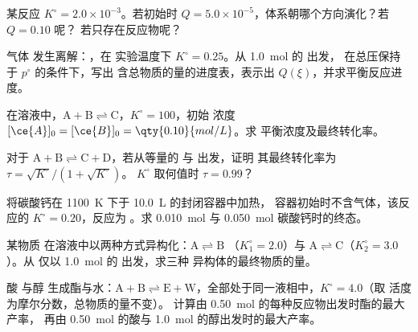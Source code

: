 \begin{exercise}[$\star\star$]\label{exo:b1:extent-q-and-k:6}
某反应 $K^\circ = 2.0 \times 10^{-3}$。若初始时
$Q = 5.0 \times 10^{-5}$，体系朝哪个方向演化？若 $Q = 0.10$ 呢？
若只存在反应物呢？
\end{exercise}

\begin{exercise}[$\star\star$]\label{exo:b1:extent-q-and-k:7}
气体  发生离解：，在
实验温度下 $K^\circ = 0.25$。从 \qty{1.0}{mol} 的  出发，
在总压保持于 $p^\circ$ 的条件下，写出
含总物质的量的进度表，表示出 $Q(\xi)$，并求平衡反应进度。
\end{exercise}

\begin{exercise}[$\star\star$]\label{exo:b1:extent-q-and-k:8}
在溶液中，$\mathrm{A + B \rightleftharpoons C}$，$K^\circ = 100$，初始
浓度 $[\ce{A}]_0 = [\ce{B}]_0 = \qty{0.10}{mol/L}$。求
平衡浓度及最终转化率。
\end{exercise}

\begin{exercise}[$\star\star$]\label{exo:b1:extent-q-and-k:9}
对于 $\mathrm{A + B \rightleftharpoons C + D}$，若从等量的  与  出发，证明
其最终转化率为 $\tau = \sqrt{K^\circ}/(1 + \sqrt{K^\circ})$。
$K^\circ$ 取何值时 $\tau = 0.99$？
\end{exercise}

\begin{exercise}[$\star\star\star$]\label{exo:b1:extent-q-and-k:10}
将碳酸钙在 \qty{1100}{K} 下于 \qty{10.0}{L} 的封闭容器中加热，
容器初始时不含气体，该反应的 $K^\circ = 0.20$，反应为
。求
\qty{0.010}{mol} 与 \qty{0.050}{mol} 碳酸钙时的终态。
\end{exercise}

\begin{exercise}[$\star\star\star$]\label{exo:b1:extent-q-and-k:11}
某物质  在溶液中以两种方式异构化：$\mathrm{A \rightleftharpoons B}$
（$K_1^\circ = 2.0$）与 $\mathrm{A \rightleftharpoons C}$（$K_2^\circ = 3.0$）。从
仅以 \qty{1.0}{mol} 的  出发，求三种
异构体的最终物质的量。
\end{exercise}

\begin{exercise}[$\star\star\star$]\label{exo:b1:extent-q-and-k:12}
酸  与醇  生成酯与水：$\mathrm{A + B
\rightleftharpoons E + W}$，全部处于同一液相中，$K^\circ = 4.0$（取
活度为摩尔分数，总物质的量不变）。
计算由 \qty{0.50}{mol} 的每种反应物出发时酯的最大产率，
再由 \qty{0.50}{mol} 的酸与 \qty{1.0}{mol} 的醇出发时的最大产率。
\end{exercise}

